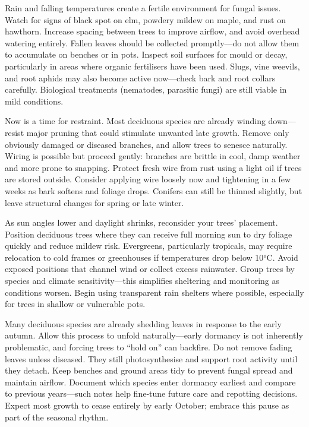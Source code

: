 \medskip  
{}  
\noindent  
Rain and falling temperatures create a fertile environment for fungal issues.  
Watch for signs of black spot on elm, powdery mildew on maple, and rust on hawthorn.  
Increase spacing between trees to improve airflow, and avoid overhead watering entirely.  
%
Fallen leaves should be collected promptly---do not allow them to accumulate on benches or in pots.  
Inspect soil surfaces for mould or decay, particularly in areas where organic fertilisers have been used.  
Slugs, vine weevils, and root aphids may also become active now---check bark and root collars carefully.  
Biological treatments (nematodes, parasitic fungi) are still viable in mild conditions.  

\medskip  
{}  
\noindent  
Now is a time for restraint.  
Most deciduous species are already winding down---resist major pruning that could stimulate unwanted late growth.  
Remove only obviously damaged or diseased branches, and allow trees to senesce naturally.  
%
Wiring is possible but proceed gently: branches are brittle in cool, damp weather and more prone to snapping.  
Protect fresh wire from rust using a light oil if trees are stored outside.  
Consider applying wire loosely now and tightening in a few weeks as bark softens and foliage drops.  
Conifers can still be thinned slightly, but leave structural changes for spring or late winter.  

\medskip  
{}  
\noindent  
As sun angles lower and daylight shrinks, reconsider your trees’ placement.  
Position deciduous trees where they can receive full morning sun to dry foliage quickly and reduce mildew risk.  
Evergreens, particularly tropicals, may require relocation to cold frames or greenhouses if temperatures drop below 10°C.  
%
Avoid exposed positions that channel wind or collect excess rainwater.  
Group trees by species and climate sensitivity---this simplifies sheltering and monitoring as conditions worsen.  
Begin using transparent rain shelters where possible, especially for trees in shallow or vulnerable pots.  

\medskip  
{}  
\noindent  
Many deciduous species are already shedding leaves in response to the early autumn.  
Allow this process to unfold naturally---early dormancy is not inherently problematic, and forcing trees to ``hold on'' can backfire.  
Do not remove fading leaves unless diseased. They still photosynthesise and support root activity until they detach.  
%
Keep benches and ground areas tidy to prevent fungal spread and maintain airflow.  
Document which species enter dormancy earliest and compare to previous years---such notes help fine\--tune future care and repotting decisions.  
Expect most growth to cease entirely by early October; embrace this pause as part of the seasonal rhythm.  

